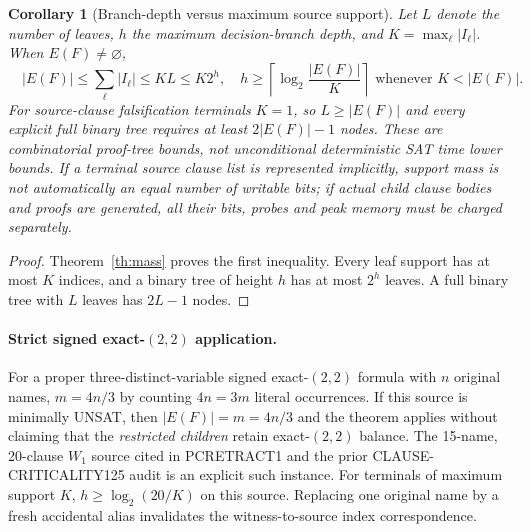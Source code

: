 \documentclass[11pt]{article}
\newtheorem{corollary}[theorem]{Corollary}
\begin{document}
\begin{corollary}[Branch-depth versus maximum source support]\label{co:depth}
Let $L$ denote the number of leaves, $h$ the maximum decision-branch depth, and $K=\max_\ell|I_\ell|$. When $E(F)\ne\varnothing$,
\[
\boxed{\quad |E(F)|\le \sum_\ell|I_\ell|\le KL\le K2^h,\quad
h\ge\left\lceil\log_2\frac{|E(F)|}{K}\right\rceil
\text{ whenever }K<|E(F)|.\quad}
\]
For source-clause falsification terminals $K=1$, so $L\ge|E(F)|$ and every explicit full binary tree requires at least $2|E(F)|-1$ nodes. These are \emph{combinatorial proof-tree bounds}, not unconditional deterministic SAT time lower bounds. If a terminal source clause list is represented implicitly, support mass is \emph{not} automatically an equal number of writable bits; if actual child clause bodies and proofs are generated, all their bits, probes and peak memory must be charged separately.
\end{corollary}
\begin{proof}
Theorem~\ref{th:mass} proves the first inequality. Every leaf support has at most $K$ indices, and a binary tree of height $h$ has at most $2^h$ leaves. A full binary tree with $L$ leaves has $2L-1$ nodes.
\end{proof}

\paragraph{Strict signed exact-$(2,2)$ application.}
For a proper three-distinct-variable signed exact-$(2,2)$ formula with $n$ original names, $m=4n/3$ by counting $4n=3m$ literal occurrences. If this source is minimally UNSAT, then $|E(F)|=m=4n/3$ and the theorem applies without claiming that the \emph{restricted children} retain exact-$(2,2)$ balance. The 15-name, 20-clause $W_1$ source cited in PCRETRACT1 and the prior CLAUSE-CRITICALITY125 audit is an explicit such instance. For terminals of maximum support $K$, $h\ge\log_2(20/K)$ on this source. Replacing one original name by a fresh accidental alias invalidates the witness-to-source index correspondence.
\end{document}
